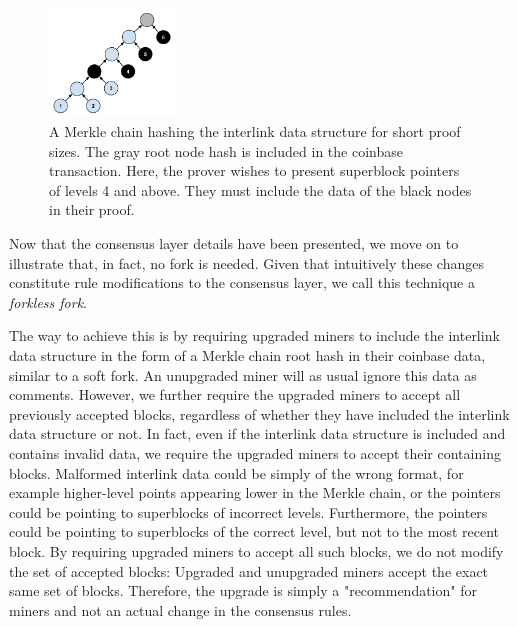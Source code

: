 \begin{figure}[h]
    \caption{\label{fig.merkle_chain}
    A Merkle chain hashing the interlink data structure for short
    proof sizes. The gray root node hash is included in the coinbase
    transaction. Here, the prover wishes to present superblock pointers of
    levels 4 and above. They must include the data of the black nodes in their
    proof.}
    \centering
    \includegraphics[width=0.3\textwidth,keepaspectratio]{figures/merkle-chain.png}
\end{figure}

Now that the consensus layer details have been presented, we move on to
illustrate that, in fact, no fork is needed. Given that intuitively these
changes constitute rule modifications to the consensus layer, we call this
technique a \textit{forkless fork}.

The way to achieve this is by requiring upgraded miners to include the
interlink data structure in the form of a Merkle chain root hash in their
coinbase data, similar to a soft fork. An unupgraded miner will as usual ignore
this data as comments. However, we further require the upgraded miners to
accept all previously accepted blocks, regardless of whether they have included
the interlink data structure or not. In fact, even if the interlink data
structure is included and contains invalid data, we require the upgraded miners
to accept their containing blocks. Malformed interlink data could be simply of
the wrong format, for example higher-level points appearing lower in the Merkle
chain, or the pointers could be pointing to superblocks of incorrect
levels. Furthermore, the pointers could be pointing to superblocks of the
correct level, but not to the most recent block. By requiring upgraded miners
to accept all such blocks, we do not modify the set of accepted blocks:
Upgraded and unupgraded miners accept the exact same set of blocks. Therefore,
the upgrade is simply a "recommendation" for miners and not an actual change in
the consensus rules.

